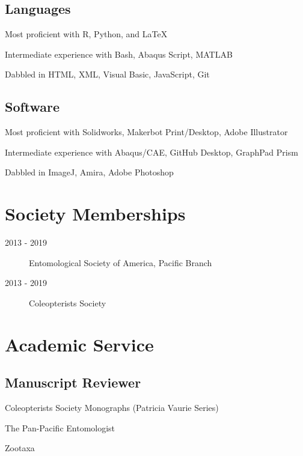 \documentclass[12pt,a4paper]{article}
\begin{document}
	\subsection*{Languages}
		\begin{description}
			\item Most proficient with R, Python, and \LaTeX
			\item Intermediate experience with Bash, Abaqus Script, MATLAB
			\item Dabbled in HTML, XML, Visual Basic, JavaScript, Git
		\end{description}
		
	\subsection*{Software}
		\begin{description}
			\item Most proficient with Solidworks, Makerbot Print/Desktop, Adobe Illustrator
			\item Intermediate experience with Abaqus/CAE, GitHub Desktop, GraphPad Prism
			\item Dabbled in ImageJ, Amira, Adobe Photoshop
		\end{description}


\section*{Society Memberships}
	\begin{description}
		\item [2013 - 2019] Entomological Society of America, Pacific Branch
		\item [2013 - 2019] Coleopterists Society
	\end{description}

\section*{Academic Service}
	\subsection*{Manuscript Reviewer}
		\begin{description}
			\item Coleopterists Society Monographs (Patricia Vaurie Series) 
			\item The Pan-Pacific Entomologist 
			\item Zootaxa
		\end{description}
\end{document}
